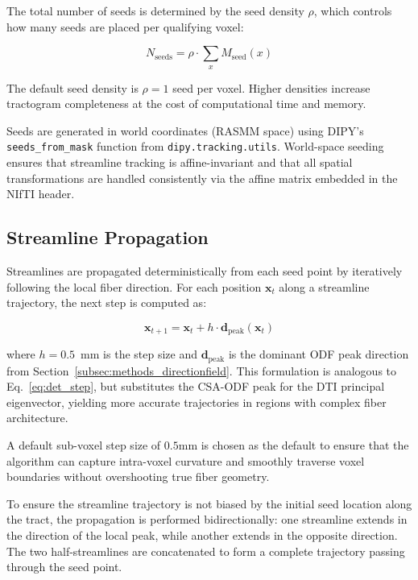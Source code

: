 The total number of seeds is determined by the seed density $\rho$, which controls how many seeds are placed per qualifying voxel:

\begin{equation}
	N_{\text{seeds}} = \rho \cdot \sum_{x} M_{\text{seed}}(x)
	\label{eq:seed_count}
\end{equation}

The default seed density is $\rho = 1$ seed per voxel. Higher densities increase tractogram completeness at the cost of computational time and memory.

Seeds are generated in world coordinates (RASMM space) using DIPY's \texttt{seeds\_from\_mask} function from \texttt{dipy.tracking.utils}. World-space seeding ensures that streamline tracking is affine-invariant and that all spatial transformations are handled consistently via the affine matrix embedded in the NIfTI header.

\subsection{Streamline Propagation}
\label{subsec:methods_propagation}

Streamlines are propagated deterministically from each seed point by iteratively following the local fiber direction. For each position $\mathbf{x}_t$ along a streamline trajectory, the next step is computed as:

\begin{equation}
	\mathbf{x}_{t+1} = \mathbf{x}_t + h \cdot \mathbf{d}_{\text{peak}}(\mathbf{x}_t)
	\label{eq:propagation_step}
\end{equation}

where $h = 0.5$~mm is the step size and $\mathbf{d}_{\text{peak}}$ is the dominant ODF peak direction from Section~\ref{subsec:methods_directionfield}. This formulation is analogous to Eq.~\ref{eq:det_step}, but substitutes the CSA-ODF peak for the DTI principal eigenvector, yielding more accurate trajectories in regions with complex fiber architecture.

A default sub-voxel step size of $0.5$mm is chosen as the default to ensure that the algorithm can capture intra-voxel curvature and smoothly traverse voxel boundaries without overshooting true fiber geometry.

To ensure the streamline trajectory is not biased by the initial seed location along the tract, the propagation is performed bidirectionally: one streamline extends in the direction of the local peak, while another extends in the opposite direction. The two half-streamlines are concatenated to form a complete trajectory passing through the seed point.

